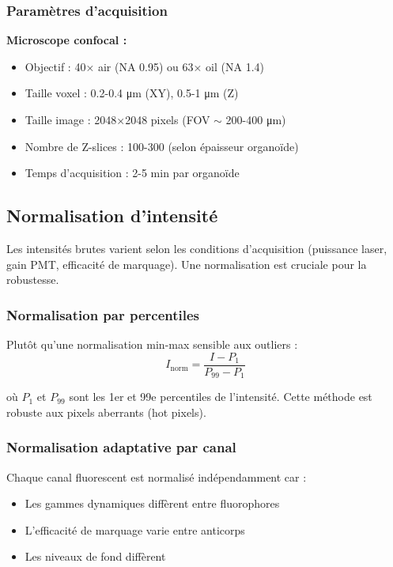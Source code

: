 \subsubsection{Paramètres d'acquisition}

\textbf{Microscope confocal :}
\begin{itemize}
    \item Objectif : 40× air (NA 0.95) ou 63× oil (NA 1.4)
    \item Taille voxel : 0.2-0.4 μm (XY), 0.5-1 μm (Z)
    \item Taille image : 2048×2048 pixels (FOV $\sim$ 200-400 μm)
    \item Nombre de Z-slices : 100-300 (selon épaisseur organoïde)
    \item Temps d'acquisition : 2-5 min par organoïde
\end{itemize}

\subsection{Normalisation d'intensité}

Les intensités brutes varient selon les conditions d'acquisition (puissance laser, gain PMT, efficacité de marquage). Une normalisation est cruciale pour la robustesse.

\subsubsection{Normalisation par percentiles}

Plutôt qu'une normalisation min-max sensible aux outliers :
\[
I_{\text{norm}} = \frac{I - P_1}{P_{99} - P_1}
\]

où $P_1$ et $P_{99}$ sont les 1er et 99e percentiles de l'intensité. Cette méthode est robuste aux pixels aberrants (hot pixels).

\subsubsection{Normalisation adaptative par canal}

Chaque canal fluorescent est normalisé indépendamment car :
\begin{itemize}
    \item Les gammes dynamiques diffèrent entre fluorophores
    \item L'efficacité de marquage varie entre anticorps
    \item Les niveaux de fond diffèrent
\end{itemize}

